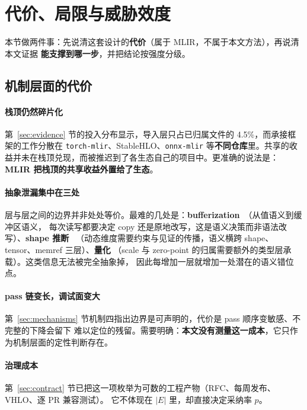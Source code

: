 
\section{代价、局限与威胁效度}
\label{sec:limitations}

本节做两件事：先说清这套设计的\textbf{代价}（属于 MLIR，不属于本文方法），再说清本文证据
\textbf{能支撑到哪一步}，并把结论按强度分级。

\subsection{机制层面的代价}

\paragraph{栈顶仍然碎片化}
第~\ref{sec:evidence} 节的投入分布显示，导入层只占已归属文件的 4.5\%，而承接框架的工作分散在
\texttt{torch-mlir}、StableHLO、\texttt{onnx-mlir} 等\textbf{不同仓库}里。共享的收益并未在栈顶兑现，而被推迟到了各生态自己的项目中。更准确的说法是：\textbf{MLIR 把栈顶的共享收益外置给了生态}。

\paragraph{抽象泄漏集中在三处}
层与层之间的边界并非处处等价。最难的几处是：\textbf{bufferization}~\cite{mlirbufferization}（从值语义到缓冲区语义，
每次读写都要决定 copy 还是原地改写，这是语义决策而非语法改写）、\textbf{shape 推断}~\cite{mlirshape}
（动态维度需要约束与见证的传播，语义横跨 shape、tensor、memref 三层）、\textbf{量化}
（scale 与 zero-point 的归属需要额外的类型层承载）。这类信息无法被完全抽象掉，
因此每增加一层就增加一处潜在的语义错位点。

\paragraph{pass 链变长，调试面变大}
第~\ref{sec:mechanisms} 节机制四指出边界是可声明的，代价是 pass 顺序变敏感、不完整的下降会留下
难以定位的残留。需要明确：\textbf{本文没有测量这一成本}，它只作为机制层面的定性判断存在。

\paragraph{治理成本}
第~\ref{sec:contract} 节已把这一项枚举为可数的工程产物（RFC、每周发布、VHLO、逐 PR 兼容测试）。
它不体现在 $|E|$ 里，却直接决定采纳率 $p$。

